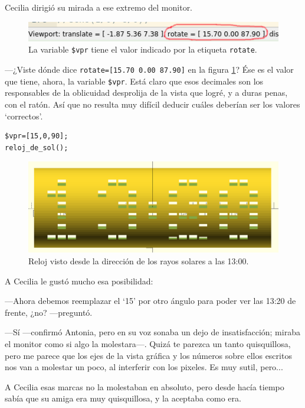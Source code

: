 Cecilia dirigió su mirada a ese extremo del monitor.


\begin{figure}[ht]
  \centering
  \includegraphics[width=.9\textwidth]{imagenes/vpr-abajo}  
  \caption{La variable \texttt{\$vpr} tiene el valor indicado por la
    etiqueta \texttt{rotate}.}
  \label{fig:vpr-abajo}
\end{figure}



---¿Viste dónde dice \texttt{rotate=[15.70 0.00 87.90]} en la figura
\ref{fig:vpr-abajo}? Ése es el valor que tiene, ahora, la variable
\texttt{\$vpr}. Está claro que esos decimales son los responsables de
la oblicuidad desprolija de la vista que logré, y a duras penas, con
el ratón. Así que no resulta muy difícil deducir cuáles deberían ser
los valores `correctos'.


\begin{lstlisting}
$vpr=[15,0,90];
reloj_de_sol();
\end{lstlisting}%

\begin{figure}[ht]
  \centering
  \includegraphics[width=.75\textwidth]{imagenes/vpr_13_00}  
  \caption{Reloj visto desde la dirección de los rayos solares a las
    13:00.}
  \label{fig:vpr_13_00}
\end{figure}

A Cecilia le gustó mucho esa posibilidad:

---Ahora debemos reemplazar el `15' por otro ángulo para poder ver las
13:20 de frente, ¿no? ---preguntó.

---Sí ---confirmó Antonia, pero en su voz sonaba un dejo de
insatisfacción; miraba el monitor como si algo la molestara---.  Quizá
te parezca un tanto quisquillosa, pero me parece que los ejes de la
vista gráfica y los números sobre ellos escritos nos van a molestar un
poco, al interferir con los pixeles. Es muy sutil, pero...

A Cecilia esas marcas no la molestaban en absoluto, pero desde hacía
tiempo sabía que su amiga era muy quisquillosa, y la aceptaba como
era.

